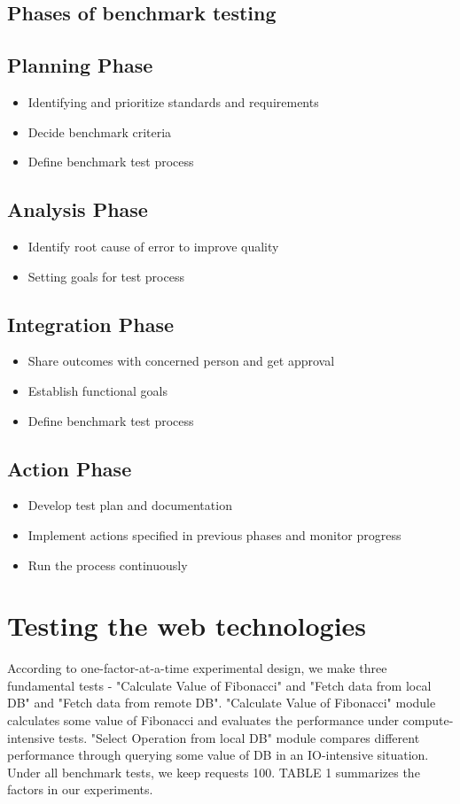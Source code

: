 \documentclass[../thesis.tex]{subfiles}
\begin{document}
\subsection{Phases of benchmark testing}
\subsection*{Planning Phase}
\begin{itemize}
	\item Identifying and prioritize standards and requirements
	\item Decide benchmark criteria
	\item Define benchmark test process
\end{itemize}
\subsection*{Analysis Phase}
\begin{itemize}
	\item Identify root cause of error to improve quality
	\item Setting goals for test process
\end{itemize}
\subsection*{Integration Phase}
\begin{itemize}
	\item Share outcomes with concerned person and get approval
	\item Establish functional goals
	\item Define benchmark test process
\end{itemize}
\subsection*{Action Phase}
\begin{itemize}
	\item Develop test plan and documentation
	\item Implement actions specified in previous phases and monitor progress
	\item Run the process continuously
\end{itemize}

\section{Testing the web technologies}
According to one-factor-at-a-time experimental design, we make three fundamental tests - "Calculate Value of Fibonacci" and "Fetch data from local DB" and "Fetch data from remote DB". "Calculate Value of Fibonacci" module calculates some value of Fibonacci and evaluates the performance under compute-intensive tests. "Select Operation from local DB" module compares different performance through querying some value of DB in an IO-intensive situation. Under all benchmark tests, we keep requests 100. TABLE 1 summarizes the factors in our experiments.
\end{document}
